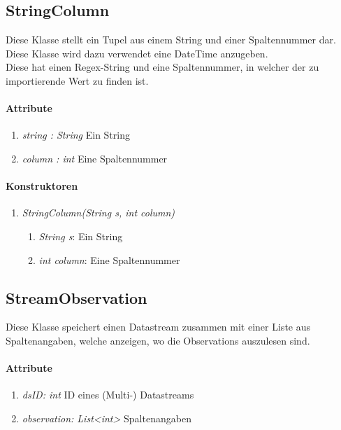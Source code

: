 \subsection*{StringColumn}\label{strCol}
Diese Klasse stellt ein Tupel aus einem String und einer Spaltennummer dar.
Diese Klasse wird dazu verwendet eine DateTime anzugeben. \\Diese hat einen Regex-String und eine Spaltennummer, in welcher der zu importierende Wert zu finden ist.
\paragraph{Attribute}
\begin{enumerate}[-]
	\item \textit{string : String} Ein String
	\item \textit{column : int} Eine Spaltennummer
\end{enumerate} 

\paragraph{Konstruktoren}
\begin{enumerate}[+]
	\item \textit{StringColumn(String s, int column)} \\
	
	\begin{enumerate}[$\bullet$]
		\item \textit{String s}: Ein String
		\item \textit{int column}: Eine Spaltennummer
	\end{enumerate}
\end{enumerate}







\subsection*{StreamObservation}\label{strObs}
Diese Klasse speichert einen Datastream zusammen mit einer Liste aus Spaltenangaben, welche anzeigen, wo die Observations auszulesen sind.
\paragraph{Attribute} 
\begin{enumerate}[-]
	\item \textit{dsID: int} ID eines (Multi-) Datastreams
	\item \textit{observation: List<int>} Spaltenangaben
\end{enumerate}

